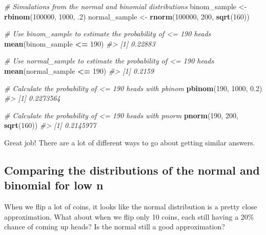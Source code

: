 \documentclass[]{article}
\newenvironment{Shaded}{\begin{snugshade}}{\end{snugshade}}
\newcommand{\CommentTok}[1]{\textcolor[rgb]{0.56,0.35,0.01}{\textit{#1}}}
\newcommand{\DecValTok}[1]{\textcolor[rgb]{0.00,0.00,0.81}{#1}}
\newcommand{\FloatTok}[1]{\textcolor[rgb]{0.00,0.00,0.81}{#1}}
\newcommand{\KeywordTok}[1]{\textcolor[rgb]{0.13,0.29,0.53}{\textbf{#1}}}
\newcommand{\NormalTok}[1]{#1}
\newcommand{\OperatorTok}[1]{\textcolor[rgb]{0.81,0.36,0.00}{\textbf{#1}}}
\newcommand{\StringTok}[1]{\textcolor[rgb]{0.31,0.60,0.02}{#1}}
\begin{document}
\begin{Shaded}
\begin{Highlighting}[]
\CommentTok{# Simulations from the normal and binomial distributions}
\NormalTok{binom_sample <-}\StringTok{ }\KeywordTok{rbinom}\NormalTok{(}\DecValTok{100000}\NormalTok{, }\DecValTok{1000}\NormalTok{, }\FloatTok{.2}\NormalTok{)}
\NormalTok{normal_sample <-}\StringTok{ }\KeywordTok{rnorm}\NormalTok{(}\DecValTok{100000}\NormalTok{, }\DecValTok{200}\NormalTok{, }\KeywordTok{sqrt}\NormalTok{(}\DecValTok{160}\NormalTok{))}

\CommentTok{# Use binom_sample to estimate the probability of <= 190 heads}
\KeywordTok{mean}\NormalTok{(binom_sample }\OperatorTok{<=}\StringTok{ }\DecValTok{190}\NormalTok{)}
\CommentTok{#> [1] 0.22883}

\CommentTok{# Use normal_sample to estimate the probability of <= 190 heads}
\KeywordTok{mean}\NormalTok{(normal_sample }\OperatorTok{<=}\StringTok{ }\DecValTok{190}\NormalTok{)}
\CommentTok{#> [1] 0.2159}

\CommentTok{# Calculate the probability of <= 190 heads with pbinom}
\KeywordTok{pbinom}\NormalTok{(}\DecValTok{190}\NormalTok{, }\DecValTok{1000}\NormalTok{, }\FloatTok{0.2}\NormalTok{)}
\CommentTok{#> [1] 0.2273564}

\CommentTok{# Calculate the probability of <= 190 heads with pnorm}
\KeywordTok{pnorm}\NormalTok{(}\DecValTok{190}\NormalTok{, }\DecValTok{200}\NormalTok{, }\KeywordTok{sqrt}\NormalTok{(}\DecValTok{160}\NormalTok{))}
\CommentTok{#> [1] 0.2145977}
\end{Highlighting}
\end{Shaded}

Great job! There are a lot of different ways to go about getting similar
answers.

\hypertarget{comparing-the-distributions-of-the-normal-and-binomial-for-low-n}{%
\subsection{Comparing the distributions of the normal and binomial for
low
n}\label{comparing-the-distributions-of-the-normal-and-binomial-for-low-n}}

When we flip a lot of coins, it looks like the normal distribution is a
pretty close approximation. What about when we flip only 10 coins, each
still having a 20\% chance of coming up heads? Is the normal still a
good approximation?
\end{document}
